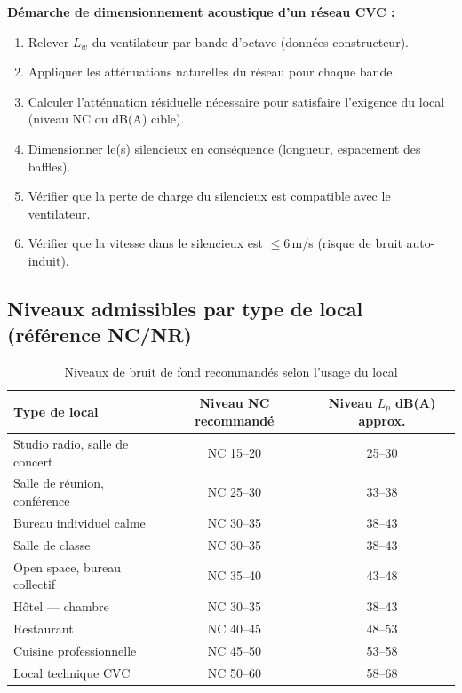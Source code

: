\begin{methode}
\textbf{Démarche de dimensionnement acoustique d'un réseau CVC :}
\begin{enumerate}
  \item Relever $L_w$ du ventilateur par bande d'octave (données constructeur).
  \item Appliquer les atténuations naturelles du réseau pour chaque bande.
  \item Calculer l'atténuation résiduelle nécessaire pour satisfaire l'exigence du local (niveau NC ou dB(A) cible).
  \item Dimensionner le(s) silencieux en conséquence (longueur, espacement des baffles).
  \item Vérifier que la perte de charge du silencieux est compatible avec le ventilateur.
  \item Vérifier que la vitesse dans le silencieux est $\leq 6$\,m/s (risque de bruit auto-induit).
\end{enumerate}
\end{methode}

\subsection{Niveaux admissibles par type de local (référence NC/NR)}

\begin{table}[H]
  \centering
  \caption{Niveaux de bruit de fond recommandés selon l'usage du local}
  \begin{tabular}{lcc}
    \toprule
    Type de local & Niveau NC recommandé & Niveau $L_p$ dB(A) approx. \\
    \midrule
    Studio radio, salle de concert & NC 15--20 & 25--30 \\
    Salle de réunion, conférence & NC 25--30 & 33--38 \\
    Bureau individuel calme & NC 30--35 & 38--43 \\
    Salle de classe & NC 30--35 & 38--43 \\
    Open space, bureau collectif & NC 35--40 & 43--48 \\
    Hôtel — chambre & NC 30--35 & 38--43 \\
    Restaurant & NC 40--45 & 48--53 \\
    Cuisine professionnelle & NC 45--50 & 53--58 \\
    Local technique CVC & NC 50--60 & 58--68 \\
    \bottomrule
  \end{tabular}
\end{table}

